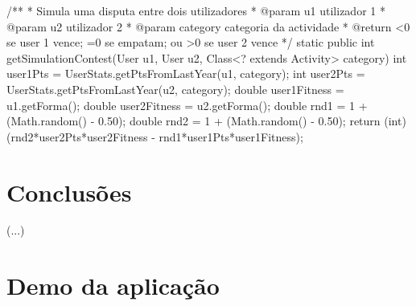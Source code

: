 \documentclass[a4paper,10pt]{report}
\begin{document}
\begin{code}[caption=Métodos para a simulação de uma disputa entre dois utilizadores (src/core/EventSimulation.java)., label=code:simulaTorneio]
/**
* Simula uma disputa entre dois utilizadores
* @param u1 utilizador 1
* @param u2 utilizador 2
* @param category categoria da actividade
* @return <0 se user 1 vence; =0 se empatam; ou >0 se user 2 vence
*/
static public int getSimulationContest(User u1, User u2, Class<? extends Activity> category){
  int user1Pts = UserStats.getPtsFromLastYear(u1, category);
  int user2Pts = UserStats.getPtsFromLastYear(u2, category);
  double user1Fitness = u1.getForma();
  double user2Fitness = u2.getForma();
  double rnd1 = 1 + (Math.random() - 0.50);
  double rnd2 = 1 + (Math.random() - 0.50);
  return (int) (rnd2*user2Pts*user2Fitness - rnd1*user1Pts*user1Fitness);
}
\end{code}  

\chapter{Conclusões}
\label{cap:concl}
(...)




\appendix
\chapter{Demo da aplicação}
\label{anex:demo}
\end{document}
